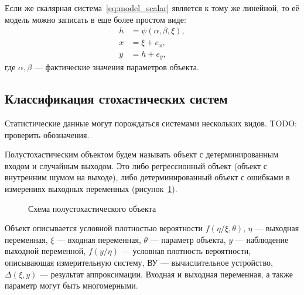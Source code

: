 Если же скалярная система~\ref{eq:model_scalar} является к тому же линейной,
то её модель можно записать в еще более простом виде:
\begin{equation}
  \label{eq:model_scalar_linear}
  \begin{aligned}
    h &= \psi (\alpha, \beta, \xi), \\
    x &= \xi + e_x, \\
    y &= h + e_y,
  \end{aligned}
\end{equation}
где \( \alpha, \beta \) --- фактические значения параметров объекта.

\subsection{Классификация стохастических систем}

{\color{red} Статистические данные могут порождаться системами нескольких видов.}
{\color{red} TODO: проверить обозначения}.

Полустохастическим объектом будем называть объект с детерминированным входом и случайным выходом.
Это либо регрессионный объект (объект с внутренним шумом на выходе),
либо детерминированный объект с ошибками в измерениях выходных переменных (рисунок~\ref{fig:type_half}).

\begin{figure}[h!]
  \centering
  \caption{Схема полустохастического объекта}
  \label{fig:type_half}
\end{figure}

Объект описывается условной плотностью вероятности \( f(\eta / \xi, \theta) \),
\( \eta \) --- выходная переменная,
\( \xi \) --- входная переменная,
\( \theta \) --- параметр объекта,
\( y \) --- наблюдение выходной переменной,
\( f(y / \eta) \) --- условная плотность вероятности, описывающая измерительную систему,
ВУ --- вычислительное устройство,
\( \Delta(\xi, y) \) --- результат аппроксимации.
Входная и выходная переменная, а также параметр могут быть многомерными.

